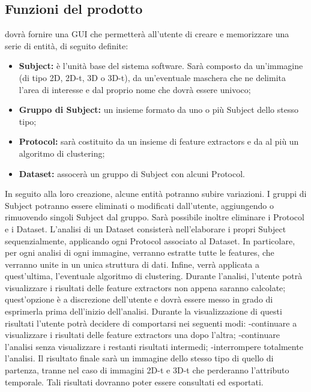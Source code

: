 \subsection{Funzioni del prodotto}
\project{} dovrà fornire una GUI\glossario{} che permetterà all'utente di creare e memorizzare una serie di entità, di seguito definite: 
\begin{itemize}
\item\textbf{Subject:} è l'unità base del sistema software. Sarà composto da un'immagine (di tipo 2D, 2D-t, 3D o 3D-t), da un'eventuale maschera\glossario{} che ne delimita l'area di interesse e dal proprio nome che dovrà essere univoco;
\item\textbf{Gruppo di Subject\glossario{}:} un insieme formato da uno o più Subject\glossario{} dello stesso tipo; 
\item\textbf{Protocol:} sarà costituito da un insieme di feature extractors\glossario{} e da al più un algoritmo di clustering\glossario{};
\item\textbf{Dataset:} assocerà un gruppo di Subject\glossario{} con alcuni Protocol\glossario{}.
\end{itemize} 
In seguito alla loro creazione, alcune entità potranno subire variazioni. 
I gruppi di Subject\glossario{} potranno essere eliminati o modificati dall'utente, aggiungendo o rimuovendo singoli Subject\glossario{} dal gruppo. Sarà possibile inoltre eliminare i Protocol\glossario{} e i Dataset\glossario{}.
L'analisi di un Dataset\glossario{} consisterà nell'elaborare i propri Subject\glossario{} sequenzialmente, applicando ogni Protocol\glossario{} associato al Dataset\glossario{}. In particolare, per ogni analisi di ogni immagine, verranno estratte tutte le features, che verranno unite in un unica struttura di dati. Infine, verrà applicata a quest'ultima, l'eventuale algoritmo di clustering\glossario{}. 
Durante l'analisi, l'utente potrà visualizzare i risultati delle feature extractors\glossario{} non appena saranno calcolate; quest'opzione è a discrezione dell'utente e dovrà essere messo in grado di esprimerla prima dell'inizio dell'analisi. Durante la visualizzazione di questi risultati l'utente potrà decidere di comportarsi nei seguenti modi:
-continuare a visualizzare i risultati delle feature extractors\glossario{} una dopo l'altra;
-continuare l'analisi senza visualizzare i restanti risultati intermedi;
-interrompere totalmente l'analisi.
Il risultato finale sarà un immagine dello stesso tipo di quello di partenza, tranne nel caso di immagini 2D-t e 3D-t che perderanno l'attributo temporale. Tali risultati dovranno poter essere consultati ed esportati.

